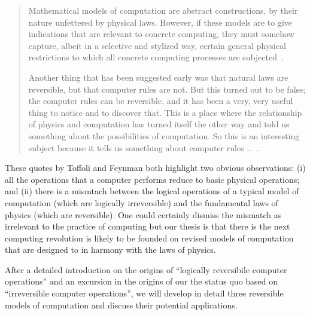 \documentclass{article}
\begin{document}
\begin{quote}
  Mathematical models of computation are abstract constructions, by
  their nature unfettered by physical laws. However, if these models
  are to give indications that are relevant to concrete computing,
  they must somehow capture, albeit in a selective and stylized way,
  certain general physical restrictions to which all concrete
  computing processes are subjected~\cite{toffoli:1980}.

  Another thing that has been suggested early was that natural laws
  are reversible, but that computer rules are not. But this turned out
  to be false; the computer rules can be reversible, and it has been a
  very, very useful thing to notice and to discover that. This is a
  place where the relationship of physics and computation has turned
  itself the other way and told us something about the possibilities
  of computation. So this is an interesting subject because it tells
  us something about computer rules
  \ldots~\cite{springerlink:10.1007/bf02650179}.
\end{quote}

These quotes by Toffoli and Feynman both highlight two obvious
observations: (i) all the operations that a computer performs reduce
to basic physical operations; and (ii) there is a mismtach between the
logical operations of a typical model of computation (which are
logically irreversible) and the fundamental laws of physics (which are
reversible). One could certainly dismiss the mismatch as irrelevant to
the practice of computing but our thesis is that there is the next
computing revolution is likely to be founded on revised models of
computation that are designed to in harmony with the laws of physics.

After a detailed introduction on the origins of ``logically
reversibile computer operations'' and an excursion in the origins of
our the status quo based on ``irreversible computer operations'', we
will develop in detail three reversible models of computation and
discuss their potential applications. 
\end{document}
